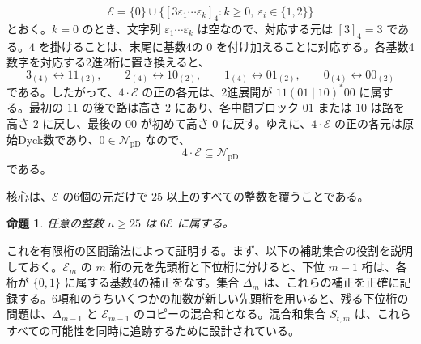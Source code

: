 \documentclass[12pt]{ltjsarticle}
\theoremstyle{plain}
\newtheorem{proposition}[theorem]{命題}
\theoremstyle{definition}
\theoremstyle{plain}
\newcommand{\val}[2]{[#1]_{#2}}
\newcommand{\NpD}{\mathcal{N}_{\mathrm{pD}}}
\begin{document}
\[
 \mathcal E=\{0\}\cup
 \bigl\{\val{3\varepsilon_1\cdots\varepsilon_k}{4}:
        k\geq0,\ \varepsilon_i\in\{1,2\}\bigr\}
\]
とおく。$k=0$ のとき、文字列 $\varepsilon_1\cdots\varepsilon_k$ は空なので、対応する元は $\val{3}{4}=3$ である。$4$ を掛けることは、末尾に基数4の $0$ を付け加えることに対応する。各基数4数字を対応する2進2桁に置き換えると、
\[
 3_{(4)}\longleftrightarrow11_{(2)},\qquad
 2_{(4)}\longleftrightarrow10_{(2)},\qquad
 1_{(4)}\longleftrightarrow01_{(2)},\qquad
 0_{(4)}\longleftrightarrow00_{(2)}
\]
である。したがって、$4\cdot\mathcal E$ の正の各元は、2進展開が $11(01\mid10)^*00$ に属する。最初の $11$ の後で路は高さ $2$ にあり、各中間ブロック $01$ または $10$ は路を高さ $2$ に戻し、最後の $00$ が初めて高さ $0$ に戻す。ゆえに、$4\cdot\mathcal E$ の正の各元は原始Dyck数であり、$0\in\NpD$ なので、
\begin{equation}\label{eq:4E}
        4\cdot\mathcal E\subseteq\NpD
\end{equation}
である。

核心は、$\mathcal E$ の6個の元だけで $25$ 以上のすべての整数を覆うことである。

\begin{proposition}\label{prop:E}
任意の整数 $n\geq25$ は $6\mathcal E$ に属する。
\end{proposition}

これを有限桁の区間論法によって証明する。まず、以下の補助集合の役割を説明しておく。$\mathcal E_m$ の $m$ 桁の元を先頭桁と下位桁に分けると、下位 $m-1$ 桁は、各桁が $\{0,1\}$ に属する基数4の補正をなす。集合 $\Delta_m$ は、これらの補正を正確に記録する。6項和のうちいくつかの加数が新しい先頭桁を用いると、残る下位桁の問題は、$\Delta_{m-1}$ と $\mathcal E_{m-1}$ のコピーの混合和となる。混合和集合 $S_{t,m}$ は、これらすべての可能性を同時に追跡するために設計されている。
\end{document}

